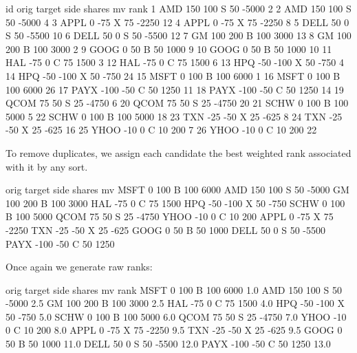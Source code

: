 \documentclass{article}
\begin{document}
\begin{Schunk}
\begin{Soutput}
     id orig target side shares    mv rank
1   AMD  150    100    S     50 -5000    2
2   AMD  150    100    S     50 -5000    4
3  APPL    0    -75    X     75 -2250   12
4  APPL    0    -75    X     75 -2250    8
5  DELL   50      0    S     50 -5500   10
6  DELL   50      0    S     50 -5500   12
7    GM  100    200    B    100  3000   13
8    GM  100    200    B    100  3000    2
9  GOOG    0     50    B     50  1000    9
10 GOOG    0     50    B     50  1000   10
11  HAL  -75      0    C     75  1500    3
12  HAL  -75      0    C     75  1500    6
13  HPQ  -50   -100    X     50  -750    4
14  HPQ  -50   -100    X     50  -750   24
15 MSFT    0    100    B    100  6000    1
16 MSFT    0    100    B    100  6000   26
17 PAYX -100    -50    C     50  1250   11
18 PAYX -100    -50    C     50  1250   14
19 QCOM   75     50    S     25 -4750    6
20 QCOM   75     50    S     25 -4750   20
21 SCHW    0    100    B    100  5000    5
22 SCHW    0    100    B    100  5000   18
23  TXN  -25    -50    X     25  -625    8
24  TXN  -25    -50    X     25  -625   16
25 YHOO  -10      0    C     10   200    7
26 YHOO  -10      0    C     10   200   22
\end{Soutput}
\end{Schunk}

To remove duplicates, we assign each candidate the best weighted rank
associated with it by any sort.  


\begin{Schunk}
\begin{Soutput}
     orig target side shares    mv
MSFT    0    100    B    100  6000
AMD   150    100    S     50 -5000
GM    100    200    B    100  3000
HAL   -75      0    C     75  1500
HPQ   -50   -100    X     50  -750
SCHW    0    100    B    100  5000
QCOM   75     50    S     25 -4750
YHOO  -10      0    C     10   200
APPL    0    -75    X     75 -2250
TXN   -25    -50    X     25  -625
GOOG    0     50    B     50  1000
DELL   50      0    S     50 -5500
PAYX -100    -50    C     50  1250
\end{Soutput}
\end{Schunk}

Once again we generate raw ranks:

\begin{Schunk}
\begin{Soutput}
     orig target side shares    mv rank
MSFT    0    100    B    100  6000  1.0
AMD   150    100    S     50 -5000  2.5
GM    100    200    B    100  3000  2.5
HAL   -75      0    C     75  1500  4.0
HPQ   -50   -100    X     50  -750  5.0
SCHW    0    100    B    100  5000  6.0
QCOM   75     50    S     25 -4750  7.0
YHOO  -10      0    C     10   200  8.0
APPL    0    -75    X     75 -2250  9.5
TXN   -25    -50    X     25  -625  9.5
GOOG    0     50    B     50  1000 11.0
DELL   50      0    S     50 -5500 12.0
PAYX -100    -50    C     50  1250 13.0
\end{Soutput}
\end{Schunk}
\end{document}
